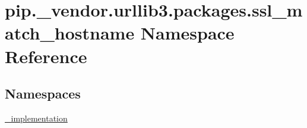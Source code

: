 \hypertarget{namespacepip_1_1__vendor_1_1urllib3_1_1packages_1_1ssl__match__hostname}{}\section{pip.\+\_\+vendor.\+urllib3.\+packages.\+ssl\+\_\+match\+\_\+hostname Namespace Reference}
\label{namespacepip_1_1__vendor_1_1urllib3_1_1packages_1_1ssl__match__hostname}
\subsection*{Namespaces}
\begin{DoxyCompactItemize}
\item 
 \hyperlink{namespacepip_1_1__vendor_1_1urllib3_1_1packages_1_1ssl__match__hostname_1_1__implementation}{\+\_\+implementation}
\end{DoxyCompactItemize}
